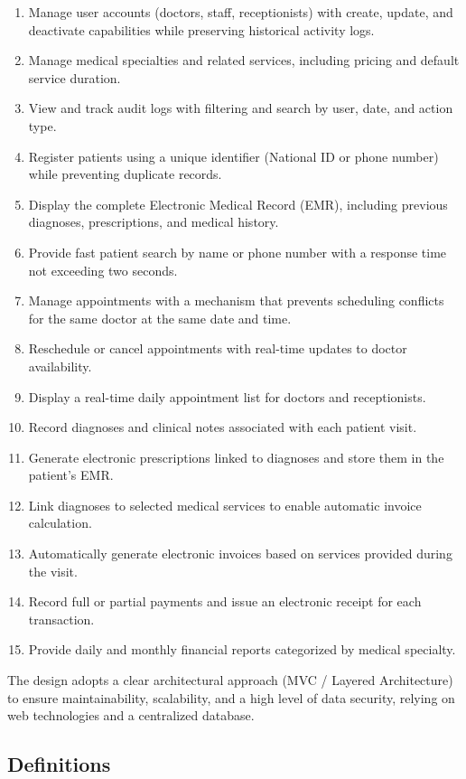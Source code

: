 \begin{enumerate}
	\item Manage user accounts (doctors, staff, receptionists) with create, update, and deactivate capabilities while preserving historical activity logs.
	\item Manage medical specialties and related services, including pricing and default service duration.
	\item View and track audit logs with filtering and search by user, date, and action type.
	\item Register patients using a unique identifier (National ID or phone number) while preventing duplicate records.
	\item Display the complete Electronic Medical Record (EMR), including previous diagnoses, prescriptions, and medical history.
	\item Provide fast patient search by name or phone number with a response time not exceeding two seconds.
	\item Manage appointments with a mechanism that prevents scheduling conflicts for the same doctor at the same date and time.
	\item Reschedule or cancel appointments with real-time updates to doctor availability.
	\item Display a real-time daily appointment list for doctors and receptionists.
	\item Record diagnoses and clinical notes associated with each patient visit.
	\item Generate electronic prescriptions linked to diagnoses and store them in the patient’s EMR.
	\item Link diagnoses to selected medical services to enable automatic invoice calculation.
	\item Automatically generate electronic invoices based on services provided during the visit.
	\item Record full or partial payments and issue an electronic receipt for each transaction.
	\item Provide daily and monthly financial reports categorized by medical specialty.
\end{enumerate}

The design adopts a clear architectural approach (MVC / Layered Architecture) to ensure maintainability, scalability, and a high level of data security, relying on web technologies and a centralized database.

\subsection{Definitions}
